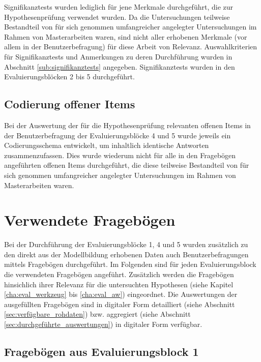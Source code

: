 Signifikanztests wurden lediglich für jene Merkmale durchgeführt, die zur Hypothesenprüfung verwendet wurden. Da die Untersuchungen teilweise Bestandteil von für sich genommen umfangreicher angelegter Untersuchungen im Rahmen von Masterarbeiten waren, sind nicht aller erhobenen Merkmale (vor allem in der Benutzerbefragung) für diese Arbeit von Relevanz. Auswahlkriterien für Signifikanztests und Anmerkungen zu deren Durchführung wurden in Abschnitt \ref{sub:signifikanztests} angegeben. Signifikanztests wurden in den Evaluierungsblöcken 2 bis 5 durchgeführt.


\subsection{Codierung offener Items} %
\label{sub:codierung_offener_items}

Bei der Auswertung der für die Hypothesenprüfung relevanten offenen Items in der Benutzerbefragung der Evaluierungsblöcke 4 und 5 wurde jeweils ein Codierungsschema entwickelt, um inhaltlich identische Antworten zusammenzufassen. Dies wurde wiederum nicht für alle in den Fragebögen angeführten offenen Items durchgeführt, die diese teilweise Bestandteil von für sich genommen umfangreicher angelegter Untersuchungen im Rahmen von Masterarbeiten waren. 


\section{Verwendete Fragebögen} %
\label{sec:frageboegen}

Bei der Durchführung der Evaluierungsblöcke 1, 4 und 5 wurden zusätzlich zu den direkt aus der Modellbildung erhobenen Daten auch Benutzerbefragungen mittels Fragebögen durchgeführt. Im Folgenden sind für jeden Evaluierungsblock die verwendeten Fragebögen angeführt. Zusätzlich werden die Fragebögen hinsichlich ihrer Relevanz für die untersuchten Hypothesen (siehe Kapitel \ref{cha:eval_werkzeug} bis \ref{cha:eval_aw}) eingeordnet. Die Auswertungen der ausgefüllten Fragebögen sind in digitaler Form detailliert (siehe Abschnitt \ref{sec:verfügbare_rohdaten}) bzw. aggregiert (siehe Abschnitt \ref{sec:durchgeführte_auswertungen}) in digitaler Form verfügbar.


\clearpage
\subsection{Fragebögen aus Evaluierungsblock 1}
\label{sub:fb_eval1}

